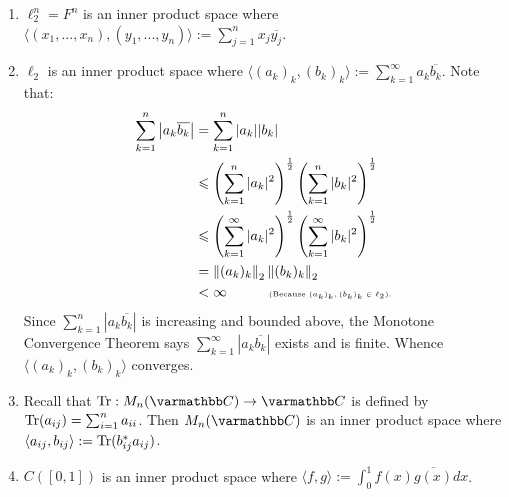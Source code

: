         \begin{center}
        \end{center}

    \begin{example}
        \phantom{a}
        \begin{enumerate}[label = (\arabic*),itemsep=1pt,topsep=3pt]
            \item $\ell_2^n = F^n$ is an inner product space where $\langle (x_1,...,x_n),(y_1,...,y_n) \rangle := \sum_{j = 1}^n x_j \overline{y_j}$.
            \item $\ell_2$ is an inner product space where $\langle (a_k)_k,(b_k)_k \rangle := \sum_{k = 1}^\infty a_k \overline{b_k}$. Note that:
                \begin{equation*}
                \begin{split}
                    \sum_{k = 1}^n \left|a_k \overline{b_k}\right| 
                    & = \sum_{k = 1}^n |a_k||b_k| \\
                    & \leqslant \left( \sum_{k = 1}^n |a_k|^2 \right)^\frac{1}{2} \left( \sum_{k = 1}^n |b_k|^2 \right)^\frac{1}{2} \\
                    & \leqslant \left( \sum_{k = 1}^\infty |a_k|^2 \right)^\frac{1}{2} \left( \sum_{k = 1}^\infty |b_k|^2 \right)^\frac{1}{2} \\
                    & = \left\lVert (a_k)_k \right\rVert_2 \left\lVert (b_k)_k \right\rVert_2 \\
                    & < \infty \quad\quad\quad \text{\tiny (Because $(a_k)_k,(b_k)_k \in \ell_2)$.}
                \end{split}
                \end{equation*}
            Since $\sum_{k = 1}^n |a_k \overline{b_k}|$ is increasing and bounded above, the Monotone Convergence Theorem says $\sum_{k = 1}^\infty|a_k \overline{b_k}|$ exists and is finite. Whence $\langle (a_k)_k,(b_k)_k \rangle$ converges.

            \item Recall that $\Tr:M_n(\bfC) \rightarrow \bfC$ is defined by $\operatorname{Tr}(a_{ij}) = \sum_{i  =1}^n a_{ii}$.
            Then $M_n(\bfC)$ is an inner product space where $\langle a_{ij},b_{ij} \rangle := \operatorname{Tr}(b_{ij}^\ast a_{ij})$.

            \item $C([0,1])$ is an inner product space where $\langle f,g \rangle := \int_0^1 f(x) \overline{g(x)}dx$.
        \end{enumerate}
    \end{example}

